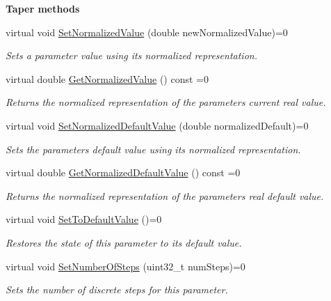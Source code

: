 \begin{Indent}{\bf Taper methods}\par
\begin{DoxyCompactItemize}
\item 
virtual void \hyperlink{a00108_ad4b9a53e4e972d1a840ef094036e5a70}{Set\+Normalized\+Value} (double new\+Normalized\+Value)=0
\begin{DoxyCompactList}\small\item\em Sets a parameter value using it\textquotesingle{}s normalized representation. \end{DoxyCompactList}\item 
virtual double \hyperlink{a00108_a32bc181c17b36fc52736d4d816c56907}{Get\+Normalized\+Value} () const =0
\begin{DoxyCompactList}\small\item\em Returns the normalized representation of the parameter\textquotesingle{}s current real value. \end{DoxyCompactList}\item 
virtual void \hyperlink{a00108_a42ce03269f84f46d5af70ac198727052}{Set\+Normalized\+Default\+Value} (double normalized\+Default)=0
\begin{DoxyCompactList}\small\item\em Sets the parameter\textquotesingle{}s default value using its normalized representation. \end{DoxyCompactList}\item 
virtual double \hyperlink{a00108_a6e645417c9296b3dd12a95cfb45babb9}{Get\+Normalized\+Default\+Value} () const =0
\begin{DoxyCompactList}\small\item\em Returns the normalized representation of the parameter\textquotesingle{}s real default value. \end{DoxyCompactList}\item 
virtual void \hyperlink{a00108_a29da0f77778437b19f1c8a666558357a}{Set\+To\+Default\+Value} ()=0
\begin{DoxyCompactList}\small\item\em Restores the state of this parameter to its default value. \end{DoxyCompactList}\item 
virtual void \hyperlink{a00108_ac81903d0388a03045a57dd4c455b6f02}{Set\+Number\+Of\+Steps} (uint32\+\_\+t num\+Steps)=0
\begin{DoxyCompactList}\small\item\em Sets the number of discrete steps for this parameter. \end{DoxyCompactList}\item 

\end{DoxyCompactItemize}
\end{Indent}
